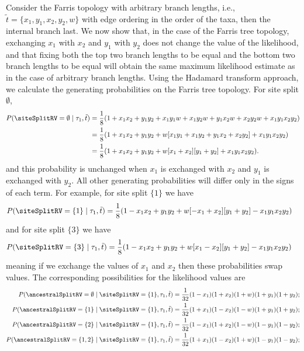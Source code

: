 Consider the Farris topology with arbitrary branch lengths, i.e., $\tilde{t}=\{x_1,y_1,x_2,y_2,w\}$ with edge ordering in the order of the taxa, then the internal branch last.
We now show that, in the case of the Farris tree topology, exchanging $x_1$ with $x_2$ and $y_1$ with $y_2$ does not change the value of the likelihood, and that fixing both the top two branch lengths to be equal and the bottom two branch lengths to be equal will obtain the same maximum likelihood estimate as in the case of arbitrary branch lengths.
Using the Hadamard transform approach, we calculate the generating probabilities on the Farris tree topology.
For site split $\emptyset$,
\begin{align*}
    P(\siteSplitRV=\emptyset\mid \tau_1, \tilde{t}) & = \frac{1}{8} (1 + x_1x_2 +  y_1y_2 +  x_1y_1w + x_1y_2w + y_1x_2w + x_2y_2w + x_1y_1x_2y_2) \\
                                              & = \frac{1}{8} (1 + x_1x_2 +  y_1y_2 +  w[x_1y_1 + x_1y_2 + y_1x_2 + x_2y_2] + x_1y_1x_2y_2) \\
                                              & = \frac{1}{8} (1 + x_1x_2 +  y_1y_2 +  w[x_1 + x_2][y_1 + y_2] + x_1y_1x_2y_2).
\end{align*}
and this probability is unchanged when $x_1$ is exchanged with $x_2$ and $y_1$ is exchanged with $y_2$.
All other generating probabilities will differ only in the signs of each term.
For example, for site split $\{1\}$ we have
\begin{align*}
    P(\siteSplitRV=\{1\}\mid \tau_1, \tilde{t}) & = \frac{1}{8} (1 - x_1x_2 +  y_1y_2 +  w[-x_1 + x_2][y_1 + y_2] - x_1y_1x_2y_2)
\end{align*}
and for site split $\{3\}$ we have
\begin{align*}
    P(\siteSplitRV=\{3\}\mid \tau_1, \tilde{t}) & = \frac{1}{8} (1 - x_1x_2 +  y_1y_2 +  w[x_1 - x_2][y_1 + y_2] - x_1y_1x_2y_2)
\end{align*}
meaning if we exchange the values of $x_1$ and $x_2$ then these probabilities swap values.
The corresponding possibilities for the likelihood values are
\begin{align*}
    P(\ancestralSplitRV=\emptyset \mid \siteSplitRV=\{1\}, \tau_1, \tilde{t}) &= \frac{1}{32}(1-x_1)(1+x_2)(1+w)(1+y_1)(1+y_2); \\
    P(\ancestralSplitRV=\{1\} \mid \siteSplitRV=\{1\}, \tau_1, \tilde{t}) &= \frac{1}{32}(1+x_1)(1-x_2)(1-w)(1+y_1)(1+y_2); \\
    P(\ancestralSplitRV=\{2\} \mid \siteSplitRV=\{1\}, \tau_1, \tilde{t}) &= \frac{1}{32}(1-x_1)(1+x_2)(1-w)(1-y_1)(1-y_2); \\
    P(\ancestralSplitRV=\{1,2\} \mid \siteSplitRV=\{1\}, \tau_1, \tilde{t}) &= \frac{1}{32}(1+x_1)(1-x_2)(1+w)(1-y_1)(1-y_2);
\end{align*}
